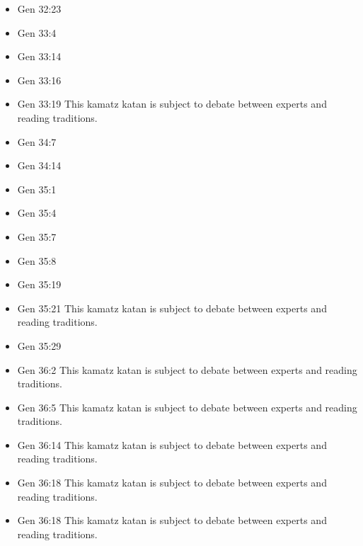 \documentclass[14pt]{book}
\begin{document}
\begin{multicols}{2}
\begin{itemize}
\item Gen 32:23

\item Gen 33:4

\item Gen 33:14

\item Gen 33:16

\item Gen 33:19 This kamatz katan is subject to debate between experts and reading traditions.

\item Gen 34:7

\item Gen 34:14

\item Gen 35:1

\item Gen 35:4

\item Gen 35:7

\item Gen 35:8

\item Gen 35:19

\item Gen 35:21 This kamatz katan is subject to debate between experts and reading traditions.

\item Gen 35:29

\item Gen 36:2 This kamatz katan is subject to debate between experts and reading traditions.

\item Gen 36:5 This kamatz katan is subject to debate between experts and reading traditions.

\item Gen 36:14 This kamatz katan is subject to debate between experts and reading traditions.

\item Gen 36:18 This kamatz katan is subject to debate between experts and reading traditions.

\item Gen 36:18 This kamatz katan is subject to debate between experts and reading traditions.


\end{itemize}
\end{multicols}
\end{document}
